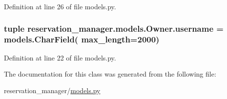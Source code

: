Definition at line 26 of file models.\-py.

\hypertarget{classreservation__manager_1_1models_1_1Owner_adf54a9032e66d1d40dc182666797f6c5}{
\subsubsection[{username}]{\setlength{\rightskip}{0pt plus 5cm}tuple reservation\-\_\-manager.\-models.\-Owner.\-username = models.\-Char\-Field( max\-\_\-length=2000)\hspace{0.3cm}{\ttfamily [static]}}}\label{classreservation__manager_1_1models_1_1Owner_adf54a9032e66d1d40dc182666797f6c5}


Definition at line 22 of file models.\-py.



The documentation for this class was generated from the following file\-:\begin{DoxyCompactItemize}
\item 
reservation\-\_\-manager/\hyperlink{reservation__manager_2models_8py}{models.\-py}\end{DoxyCompactItemize}
